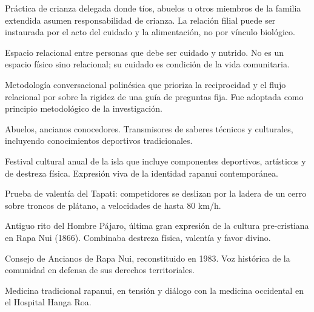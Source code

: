 \documentclass[12pt, a4paper]{article}
\begin{document}
\begin{description}[leftmargin=3cm, style=nextline, itemsep=6pt]
  \item[\textit{Hanai}] Práctica de crianza delegada donde tíos, abuelos u otros
    miembros de la familia extendida asumen responsabilidad de crianza. La relación
    filial puede ser instaurada por el acto del cuidado y la alimentación, no por
    vínculo biológico.
  \item[\textit{Vā}] Espacio relacional entre personas que debe ser cuidado y
    nutrido. No es un espacio físico sino relacional; su cuidado es condición de
    la vida comunitaria.
  \item[\textit{Talanoa}] Metodología conversacional polinésica que prioriza la
    reciprocidad y el flujo relacional por sobre la rigidez de una guía de preguntas
    fija. Fue adoptada como principio metodológico de la investigación.
  \item[\textit{Koros}] Abuelos, ancianos conocedores. Transmisores de saberes
    técnicos y culturales, incluyendo conocimientos deportivos tradicionales.
  \item[\textit{Tapati Rapa Nui}] Festival cultural anual de la isla que incluye
    componentes deportivos, artísticos y de destreza física. Expresión viva de la
    identidad rapanui contemporánea.
  \item[\textit{Haka Pei}] Prueba de valentía del Tapati: competidores se deslizan
    por la ladera de un cerro sobre troncos de plátano, a velocidades de hasta 80 km/h.
  \item[\textit{Tangata Manu}] Antiguo rito del Hombre Pájaro, última gran expresión
    de la cultura pre-cristiana en Rapa Nui (1866). Combinaba destreza física,
    valentía y favor divino.
  \item[\textit{Te Mau Hatu'o Rapa Nui}] Consejo de Ancianos de Rapa Nui,
    reconstituido en 1983. Voz histórica de la comunidad en defensa de sus
    derechos territoriales.
  \item[\textit{Papa Ra'au}] Medicina tradicional rapanui, en tensión y diálogo
    con la medicina occidental en el Hospital Hanga Roa.
\end{description}

\newpage

\end{document}
